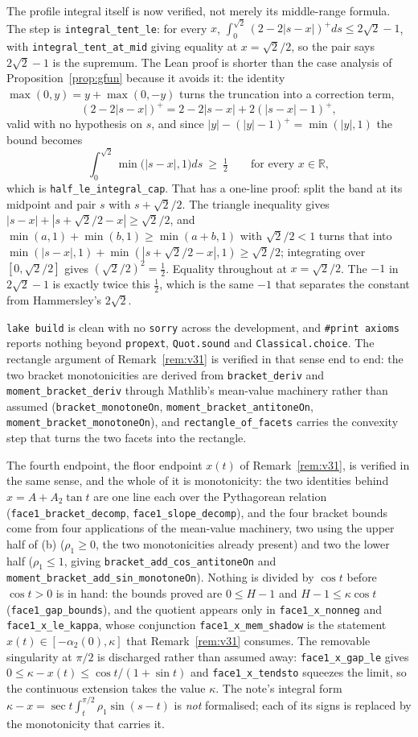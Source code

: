 \documentclass[11pt]{article}
\theoremstyle{definition}
\newcommand{\R}{\mathbb{R}}
\begin{document}
The profile integral itself is now verified, not merely its middle-range formula. The step
is \verb|integral_tent_le|: for every $x$,
$\int_0^{\sqrt2}(2-2|s-x|)^+ds\le2\sqrt2-1$, with \verb|integral_tent_at_mid| giving
equality at $x=\sqrt2/2$, so the pair says $2\sqrt2-1$ is the supremum. The Lean proof is
shorter than the case analysis of Proposition~\ref{prop:gfun} because it avoids it: the
identity $\max(0,y)=y+\max(0,-y)$ turns the truncation into a correction term,
\[
  (2-2|s-x|)^+=2-2|s-x|+2(|s-x|-1)^+ ,
\]
valid with no hypothesis on $s$, and since $|y|-(|y|-1)^+=\min(|y|,1)$ the bound becomes
\[
  \int_0^{\sqrt2}\min\bigl(|s-x|,1\bigr)ds\ \ge\ \tfrac12
  \qquad\text{for every }x\in\R ,
\]
which is \verb|half_le_integral_cap|. That has a one-line proof: split the band at its
midpoint and pair $s$ with $s+\sqrt2/2$. The triangle inequality gives
$|s-x|+|s+\sqrt2/2-x|\ge\sqrt2/2$, and $\min(a,1)+\min(b,1)\ge\min(a+b,1)$ with
$\sqrt2/2<1$ turns that into
$\min(|s-x|,1)+\min(|s+\sqrt2/2-x|,1)\ge\sqrt2/2$; integrating over $[0,\sqrt2/2]$ gives
$(\sqrt2/2)^2=\tfrac12$. Equality throughout at $x=\sqrt2/2$. The $-1$ in $2\sqrt2-1$ is
exactly twice this $\tfrac12$, which is the same $-1$ that separates the constant from
Hammersley's $2\sqrt2$.

\verb|lake build| is clean with no \verb|sorry| across the development, and
\verb|#print axioms| reports nothing beyond \verb|propext|, \verb|Quot.sound| and
\verb|Classical.choice|. The rectangle argument of Remark~\ref{rem:v31} is verified in that
sense end to end: the two bracket monotonicities are derived from
\verb|bracket_deriv| and \verb|moment_bracket_deriv| through Mathlib's mean-value
machinery rather than assumed (\verb|bracket_monotoneOn|,
\verb|moment_bracket_antitoneOn|, \verb|moment_bracket_monotoneOn|), and
\verb|rectangle_of_facets| carries the convexity step that turns the two facets into the
rectangle.

The fourth endpoint, the floor endpoint $x(t)$ of Remark~\ref{rem:v31}, is verified in the
same sense, and the whole of it is monotonicity: the two identities behind
$x=A+A_2\tan t$ are one line each over the Pythagorean relation
(\verb|face1_bracket_decomp|, \verb|face1_slope_decomp|), and the four bracket bounds come
from four applications of the mean-value machinery, two using the upper half of (b)
($\rho_1\ge0$, the two monotonicities already present) and two the lower half
($\rho_1\le1$, giving \verb|bracket_add_cos_antitoneOn| and
\verb|moment_bracket_add_sin_monotoneOn|). Nothing is divided by $\cos t$ before $\cos t>0$
is in hand: the bounds proved are $0\le H-1$ and $H-1\le\kappa\cos t$
(\verb|face1_gap_bounds|), and the quotient appears only in \verb|face1_x_nonneg| and
\verb|face1_x_le_kappa|, whose conjunction \verb|face1_x_mem_shadow| is the statement
$x(t)\in[-\alpha_2(0),\kappa]$ that Remark~\ref{rem:v31} consumes. The removable singularity
at $\pi/2$ is discharged rather than assumed away: \verb|face1_x_gap_le| gives
$0\le\kappa-x(t)\le\cos t/(1+\sin t)$ and \verb|face1_x_tendsto| squeezes the limit, so the
continuous extension takes the value $\kappa$. The note's integral form
$\kappa-x=\sec t\int_t^{\pi/2}\rho_1\sin(s-t)$ is \emph{not} formalised; each of its signs is
replaced by the monotonicity that carries it.
\end{document}
